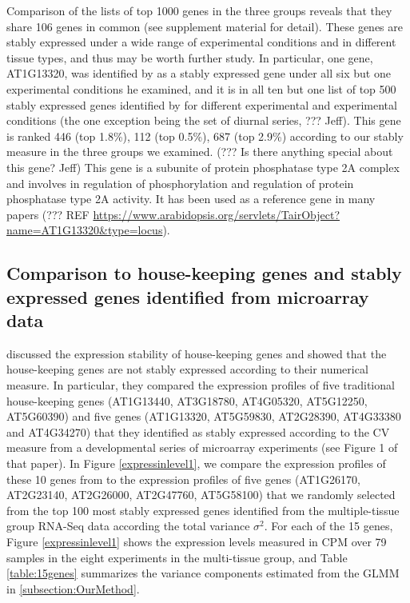\documentclass[11pt, a4paper]{article}
\begin{document}

Comparison of the lists of top 1000 genes in the three groups reveals that
they share 106 genes in common (see supplement material for detail).  These
genes are stably expressed under a wide range of experimental conditions
and in different tissue types, and thus may be worth further study.  In particular, one
gene, AT1G13320, was identified by \cite{hong2010identification} as a stably
expressed gene under all six but one experimental conditions he examined, and it is in
all ten but one list of top 500 stably expressed genes identified by
\cite{czechowski2005genome} for different experimental and experimental
conditions (the one exception being the set of diurnal series, ??? Jeff).
This gene is ranked 446 (top 1.8\%), 112 (top 0.5\%), 687 (top 2.9\%)
according to our stably measure in the three groups we examined.  (??? Is
there anything special about this gene? Jeff) This gene is a subunite of
protein phosphatase type 2A complex and involves in regulation of
phosphorylation and regulation of protein phosphatase type 2A activity. It has
been used as a reference gene in many papers (??? REF
\url{https://www.arabidopsis.org/servlets/TairObject?name=AT1G13320&type=locus}).  

\subsection{Comparison to house-keeping genes and stably expressed genes
identified from microarray data}\label{section:CompareStablyExpressedGene}
\cite{czechowski2005genome} discussed the expression stability of
house-keeping genes and showed that the house-keeping genes are not stably
expressed according to their numerical measure. In particular, they compared
the expression profiles of five traditional house-keeping genes (AT1G13440,
AT3G18780, AT4G05320, AT5G12250, AT5G60390) and five genes (AT1G13320,
AT5G59830, AT2G28390, AT4G33380 and AT4G34270) that they identified  as stably
expressed according to the CV measure from a developmental series of
microarray experiments (see Figure 1 of that paper).  
In Figure \ref{expressinlevel1}, we compare the expression profiles 
of these 10 genes from \cite{czechowski2005genome} to the expression profiles
of five genes (AT1G26170, AT2G23140, AT2G26000, AT2G47760, AT5G58100) that we
randomly selected from the top 100 most stably expressed genes identified from
the multiple-tissue group RNA-Seq data according the total variance $\sigma^2$.
For each of the 15 genes, Figure \ref{expressinlevel1} shows the expression levels measured
in CPM over 79 samples in the eight experiments in the multi-tissue group,
and Table \ref{table:15genes} summarizes the variance components estimated from the
GLMM in \ref{subsection:OurMethod}. 
\end{document}
